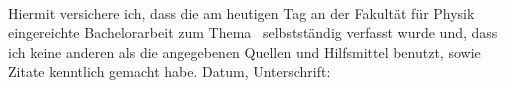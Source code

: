 \documentclass[12pt,a4paper,twoside,open=right,bibliography=totoc]{scrbook}
\begin{document}
{}

\cleardoublepage
\backmatter

\pagestyle{empty}
\pagebreak

~\vfill

\noindent
Hiermit versichere ich, dass die am heutigen Tag an der Fakultät für
Physik eingereichte Bachelorarbeit zum
Thema \glqq \thetitle\grqq\ selbstständig
verfasst wurde und, dass ich keine anderen als die angegebenen Quellen und
Hilfsmittel benutzt, sowie Zitate kenntlich gemacht habe.
\vskip 1cm
\noindent
Datum, Unterschrift: \hrulefill
\end{document}
